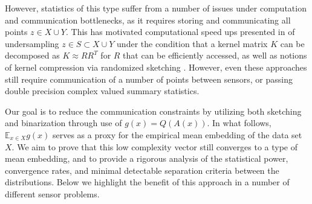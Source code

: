 \documentclass{article}
\begin{document}
However, statistics of this type suffer from a number of issues under computation and communication bottlenecks, as it requires storing and communicating all points $z\in X\cup Y$.  This has motivated computational speed ups presented in \cite{cheng2017two} of undersampling $z\in S\subset X\cup Y$ under the condition that a kernel matrix $K$ can be decomposed as $K\approx RR^T$ for $R$ that can be efficiently accessed, as well as notions of kernel compression via randomized sketching \cite{gribonval2017compressive}.  However, even these approaches still require communication of a number of points between sensors, or passing double precision complex valued summary statistics.  

Our goal is to reduce the communication constraints by utilizing both sketching and binarization through use of $g(x) = Q(A(x))$.  In what follows, $\mathbb{E}_{x\in X} g(x)$ serves as a proxy for the empirical mean embedding of the data set $X$.  We aim to prove that this low complexity vector still converges to a type of mean embedding, and to provide a rigorous analysis of the statistical power, convergence rates, and minimal detectable separation criteria between the distributions.  Below we highlight the benefit of this approach in a number of different sensor problems.
\end{document}
